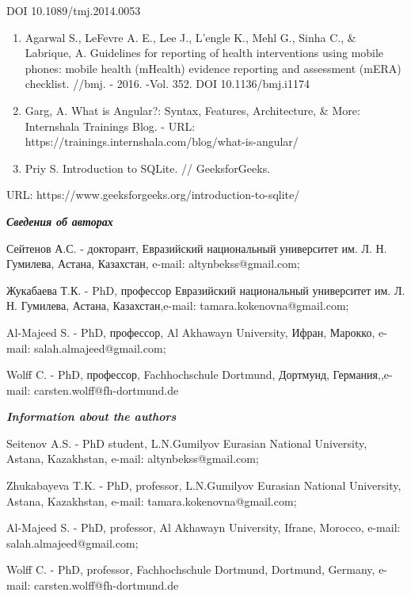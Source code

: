 DOI 10.1089/tmj.2014.0053

\begin{enumerate}
\def\labelenumi{\arabic{enumi}.}
\setcounter{enumi}{15}
\item
  Agarwal S., LeFevre A. E., Lee J., L'engle K., Mehl G., Sinha C., \&
  Labrique, A. Guidelines for reporting of health interventions using
  mobile phones: mobile health (mHealth) evidence reporting and
  assessment (mERA) checklist. //bmj. - 2016. -Vol. 352. DOI
  10.1136/bmj.i1174
\item
  Garg, A. What is Angular?: Syntax, Features, Architecture, \& More:
  Internshala Trainings Blog. - URL:
  https://trainings.internshala.com/blog/what-is-angular/
\item
  Priy S. Introduction to SQLite. // GeeksforGeeks.
\end{enumerate}

URL: https://www.geeksforgeeks.org/introduction-to-sqlite/

\emph{{\bfseries Сведения об авторах}}

Сейтенов А.С. - докторант, Евразийский национальный университет им. Л.
Н. Гумилева, Астана, Казахстан, e-mail: altynbekss@gmail.com;

Жукабаева Т.К. - PhD, профессор Евразийский национальный университет им.
Л. Н. Гумилева, Астана, Казахстан,e-mail: tamara.kokenovna@gmail.com;

Al-Majeed S. - PhD, профессор, Al Akhawayn University, Ифран, Марокко,
e-mail: salah.almajeed@gmail.com;

Wolff C. - PhD, профессор, Fachhochschule Dortmund, Дортмунд,
Германия,,e-mail: carsten.wolff@fh-dortmund.de

\emph{{\bfseries Information about the authors}}

Seitenov A.S. - PhD student, L.N.Gumilyov Eurasian National University,
Astana, Kazakhstan, e-mail: altynbekss@gmail.com;

Zhukabayeva T.K. - PhD, professor, L.N.Gumilyov Eurasian National
University, Astana, Kazakhstan, e-mail: tamara.kokenovna@gmail.com;

Al-Majeed S. - PhD, professor, Al Akhawayn University, Ifrane, Morocco,
e-mail: salah.almajeed@gmail.com;

Wolff C. - PhD, professor, Fachhochschule Dortmund, Dortmund, Germany,
e-mail: carsten.wolff@fh-dortmund.de